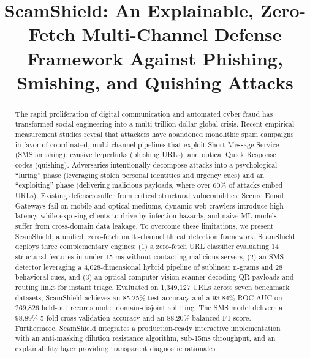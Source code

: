 \documentclass[conference]{IEEEtran}
\begin{document}
\title{ScamShield: An Explainable, Zero-Fetch Multi-Channel Defense Framework Against Phishing, Smishing, and Quishing Attacks}

\author{
\and
{}
}

\maketitle

\begin{abstract}
The rapid proliferation of digital communication and automated cyber fraud has transformed social engineering into a multi-trillion-dollar global crisis. Recent empirical measurement studies reveal that attackers have abandoned monolithic spam campaigns in favor of coordinated, multi-channel pipelines that exploit Short Message Service (SMS smishing), evasive hyperlinks (phishing URLs), and optical Quick Response codes (quishing). Adversaries intentionally decompose attacks into a psychological ``luring'' phase (leveraging stolen personal identities and urgency cues) and an ``exploiting'' phase (delivering malicious payloads, where over 60\% of attacks embed URLs). Existing defenses suffer from critical structural vulnerabilities: Secure Email Gateways fail on mobile and optical mediums, dynamic web-crawlers introduce high latency while exposing clients to drive-by infection hazards, and naive ML models suffer from cross-domain data leakage. To overcome these limitations, we present ScamShield, a unified, zero-fetch multi-channel threat detection framework. ScamShield deploys three complementary engines: (1) a zero-fetch URL classifier evaluating 14 structural features in under 15 ms without contacting malicious servers, (2) an SMS detector leveraging a 4,028-dimensional hybrid pipeline of sublinear n-grams and 28 behavioral cues, and (3) an optical computer vision scanner decoding QR payloads and routing links for instant triage. Evaluated on 1,349,127 URLs across seven benchmark datasets, ScamShield achieves an 85.25\% test accuracy and a 93.84\% ROC-AUC on 269,826 held-out records under domain-disjoint splitting. The SMS model delivers a 98.89\% 5-fold cross-validation accuracy and an 88.20\% balanced F1-score. Furthermore, ScamShield integrates a production-ready interactive implementation with an anti-masking dilution resistance algorithm, sub-15ms throughput, and an explainability layer providing transparent diagnostic rationales.
\end{abstract}
\end{document}

